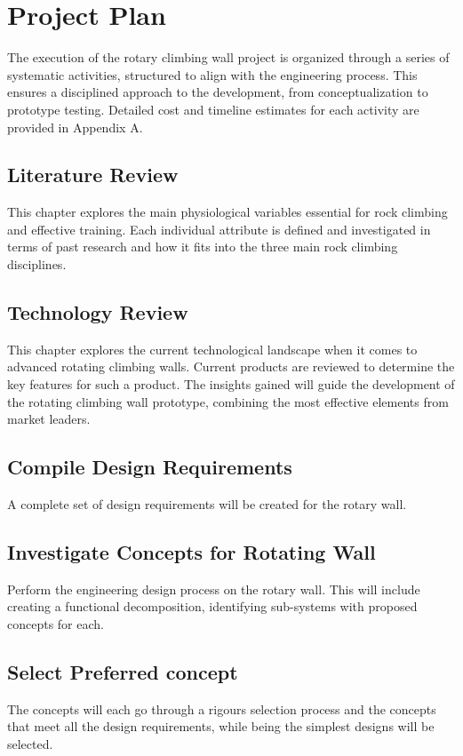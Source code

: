 \chapter{Project Plan}
The execution of the rotary climbing wall project is organized through a series of systematic activities, structured to align with the engineering process. This ensures a disciplined approach to the development, from conceptualization to prototype testing. Detailed cost and timeline estimates for each activity are provided in Appendix A.

\section{Literature Review}
This chapter explores the main physiological variables essential for rock climbing and effective training. Each individual attribute is defined and investigated in terms of past research and how it fits into the three main rock climbing disciplines.

\section{Technology Review}
This chapter explores the current technological landscape when it comes to advanced rotating climbing walls. Current products are reviewed to determine the key features for such a product. The insights gained will guide the development of the rotating climbing wall prototype, combining the most effective elements from market leaders.

\section{Compile Design Requirements}
A complete set of design requirements will be created for the rotary wall.

\section{Investigate Concepts for Rotating Wall}
Perform the engineering design process on the rotary wall. This will include creating a functional decomposition, identifying sub-systems with proposed concepts for each.

\section{Select Preferred concept} 
The concepts will each go through a rigours selection process and the concepts that meet all the design requirements, while being the simplest designs will be selected.

